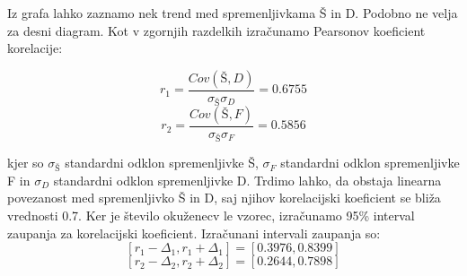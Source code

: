 \documentclass[a4paper,11pt]{article}
\begin{document}
\begin{figure}
    \centering
\end{figure}
Iz grafa lahko zaznamo nek trend med spremenljivkama Š in D. Podobno ne velja za desni diagram. Kot v zgornjih razdelkih izračunamo Pearsonov koeficient korelacije:

\[r_1 = \frac{Cov(Š,D)}{\sigma_{Š} \sigma_{D}} = 0.6755\]
\[r_2 = \frac{Cov(Š,F)}{\sigma_{Š} \sigma_{F}} = 0.5856\]

kjer so \(\sigma_{Š}\) standardni odklon spremenljivke Š, \(\sigma_{F}\) standardni odklon spremenljivke F in \(\sigma_{D}\) standardni odklon spremenljivke D. Trdimo lahko, da obstaja linearna povezanost med spremenljivko Š in D, saj njihov korelacijski koeficient se bliža vrednosti 0.7. 
Ker je število okuženecv le vzorec, izračunamo 95\% interval zaupanja za korelacijski koeficient. Izračunani intervali zaupanja so:
\[[r_1 - \Delta_1, r_1 + \Delta_1] = [0.3976, 0.8399]\]
\[[r_2 - \Delta_2, r_2 + \Delta_2] = [0.2644, 0.7898]\]
\end{document}
